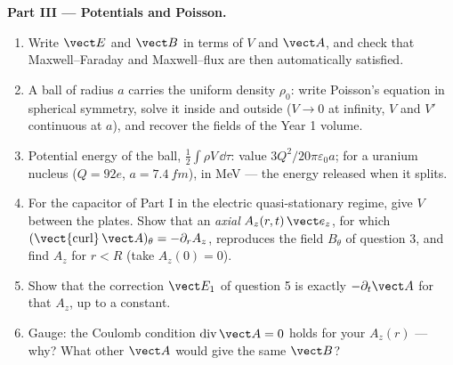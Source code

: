 \begin{problem}
\medskip
\noindent\textbf{Part III --- Potentials and Poisson.}
\begin{enumerate}[resume]
  \item Write $\vect E$ and $\vect B$ in terms of $V$ and $\vect A$, and check
        that Maxwell--Faraday and Maxwell--flux are then automatically
        satisfied.
  \item A ball of radius $a$ carries the uniform density $\rho_0$: write
        Poisson's equation in spherical symmetry, solve it inside and
        outside ($V \to 0$ at infinity, $V$ and $V'$ continuous at $a$), and
        recover the fields of the Year 1 volume.
  \item Potential energy of the ball, $\tfrac12\int\rho V\,\dd\tau$: value
        $3Q^2/20\pi\varepsilon_0a$; for a uranium nucleus ($Q = 92e$, $a =
        \qty{7.4}{fm}$), in MeV --- the energy released when it splits.
  \item For the capacitor of Part I in the electric quasi-stationary
        regime, give $V$ between the plates. Show that an \emph{axial}
         $A_z(r, t)\,\vect e_z$, for which $(\operatorname{\vect{curl}}
        \vect A)_\theta = -\partial_rA_z$, reproduces the field $B_\theta$ of
        question 3, and find $A_z$ for $r < R$ (take $A_z(0) = 0$).
  \item Show that the correction $\vect E_1$ of question 5 is exactly
        $-\partial_t\vect A$ for that $A_z$, up to a constant.
  \item Gauge: the Coulomb condition $\operatorname{div}\vect A = 0$ holds for
        your $A_z(r)$ --- why? What other $\vect A$ would give the same $\vect B$?
\end{enumerate}


\end{problem}
